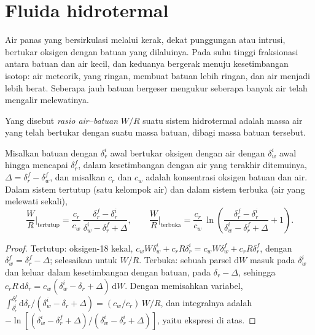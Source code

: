 \section{Fluida hidrotermal}\label{sec:b3:water-rock-interaction:hydrothermal}

Air panas yang bersirkulasi melalui kerak, dekat punggungan atau intrusi,
bertukar oksigen dengan batuan yang dilaluinya. Pada suhu tinggi fraksionasi
antara batuan dan air kecil, dan keduanya bergerak menuju
kesetimbangan isotop: air meteorik, yang ringan, membuat batuan lebih ringan, dan
air menjadi lebih berat. Seberapa jauh batuan bergeser mengukur seberapa banyak air
telah mengalir melewatinya.

\begin{definition}\label{def:b3:water-rock-interaction:water-rock-ratio}
Yang disebut \emph{rasio air--batuan} $W/R$ suatu
sistem hidrotermal adalah massa air yang telah bertukar dengan suatu massa
batuan, dibagi massa batuan tersebut.
\end{definition}

\begin{proposition}\label{prop:b3:water-rock-interaction:wr}
Misalkan batuan dengan $\delta_r^i$ awal bertukar oksigen dengan air
dengan $\delta_w^i$ awal hingga mencapai $\delta_r^f$, dalam kesetimbangan dengan air
yang terakhir ditemuinya, $\Delta = \delta_r^f - \delta_w^f$, dan misalkan $c_r$ dan $c_w$ adalah
konsentrasi oksigen batuan dan air. Dalam sistem tertutup (satu kelompok air)
dan dalam sistem terbuka (air yang melewati sekali),
\[
\frac WR\Big|_{\text{tertutup}} = \frac{c_r}{c_w}\,
\frac{\delta_r^f - \delta_r^i}{\delta_w^i - \delta_r^f + \Delta},
\qquad
\frac WR\Big|_{\text{terbuka}} = \frac{c_r}{c_w}\,
\ln\!\left(\frac{\delta_r^f - \delta_r^i}{\delta_w^i - \delta_r^f + \Delta} + 1\right).
\]
\end{proposition}

\begin{proof}
Tertutup: oksigen-18 kekal, $c_wW\delta_w^i + c_rR\delta_r^i = c_wW
\delta_w^f + c_rR\delta_r^f$, dengan $\delta_w^f = \delta_r^f - \Delta$; selesaikan
untuk $W/R$. Terbuka: sebuah parsel $\mathrm dW$ masuk pada $\delta_w^i$ dan keluar dalam
kesetimbangan dengan batuan, pada $\delta_r - \Delta$, sehingga $c_rR\,\mathrm d\delta_r
= c_w(\delta_w^i - \delta_r + \Delta)\,\mathrm dW$. Dengan memisahkan variabel,
$\int_{\delta_r^i}^{\delta_r^f}\mathrm d\delta_r/(\delta_w^i - \delta_r +
\Delta) = (c_w/c_r)\,W/R$, dan integralnya adalah $-\ln[(\delta_w^i - \delta_r^f
+ \Delta)/(\delta_w^i - \delta_r^i + \Delta)]$, yaitu ekspresi di atas.
\end{proof}

